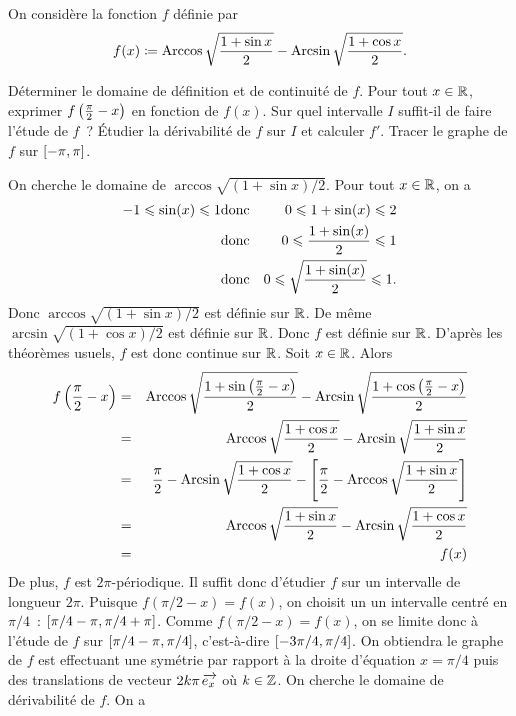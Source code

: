 \documentclass{magnolia}
\begin{document}
On considère la fonction $f$ définie par
$$f(x)\coloneqq\operatorname{Arccos}\sqrt{\frac{1+\sin x}{2}}-\operatorname{Arcsin}\sqrt{\frac{1+\cos x}{2}}.$$
\begin{questions}
\question Déterminer le domaine de définition et de continuité de $f$.
\question Pour tout $x\in\mathbb{R}$, exprimer $f\left(\frac{\pi}{2}-x\right)$ en fonction de
  $f(x)$. Sur quel intervalle $I$ suffit-il de faire l'étude de $f$~?
\question Étudier la dérivabilité de $f$ sur $I$ et calculer $f'$.
\question Tracer le graphe de $f$ sur $\left[-\pi,\pi\right]$.
\end{questions}
\begin{sol}
\begin{questions}
\question On cherche le domaine de $\arccos\sqrt{(1+\sin x)/2}$. Pour tout $x\in\mathbb{R}$, on a
\begin{eqnarray*}
-1\leqslant\sin(x)\leqslant 1
&\text{donc}& 0\leqslant 1+\sin(x)\leqslant 2\\
&\text{donc}& 0\leqslant \frac{1+\sin(x)}{2}\leqslant 1\\
&\text{donc}& 0\leqslant \sqrt{\frac{1+\sin(x)}{2}}\leqslant 1.
\end{eqnarray*}
Donc $\arccos\sqrt{(1+\sin x)/2}$ est définie sur $\mathbb{R}$. De même $\arcsin\sqrt{(1+\cos x)/2}$ est définie sur $\mathbb{R}$. Donc $f$ est définie sur $\mathbb{R}$. D'après les théorèmes usuels, $f$ est donc continue sur $\mathbb{R}$.
\question Soit $x\in\mathbb{R}$. Alors
\begin{eqnarray*}
f\left(\frac{\pi}{2}-x\right)
&=& \operatorname{Arccos}\sqrt{\frac{1+\sin\left(\frac{\pi}{2}-x\right)}{2}}-\operatorname{Arcsin}\sqrt{\frac{1+\cos\left(\frac{\pi}{2}-x\right)}{2}}\\
&=& \operatorname{Arccos}\sqrt{\frac{1+\cos x}{2}}-\operatorname{Arcsin}\sqrt{\frac{1+\sin x}{2}}\\
&=& \frac{\pi}{2}-\operatorname{Arcsin}\sqrt{\frac{1+\cos x}{2}}-\left[\frac{\pi}{2}-\operatorname{Arccos}\sqrt{\frac{1+\sin x}{2}}\right]\\
&=& \operatorname{Arccos}\sqrt{\frac{1+\sin x}{2}} - \operatorname{Arcsin}\sqrt{\frac{1+\cos x}{2}}\\
&=& f(x)
\end{eqnarray*}
De plus, $f$ est $2\pi$-périodique. Il suffit donc d'étudier $f$ sur un intervalle de longueur $2\pi$. Puisque $f(\pi/2-x)=f(x)$, on choisit un un intervalle centré en $\pi/4$~: $\left[\pi/4-\pi,\pi/4+\pi\right]$. Comme $f(\pi/2-x)=f(x)$, on se limite donc à l'étude de $f$ sur $\left[\pi/4-\pi,\pi/4\right]$, c'est-à-dire $\left[-3\pi/4,\pi/4\right]$.
On obtiendra le graphe de $f$ est effectuant une symétrie par rapport à la droite d'équation $x=\pi/4$ puis des translations de vecteur $2k\pi\kern 2pt\overrightarrow{\kern -2pte_x}$ où $k\in\mathbb{Z}$.
\question On cherche le domaine de dérivabilité de $f$. On a

\end{questions}
\end{sol}
\end{document}
